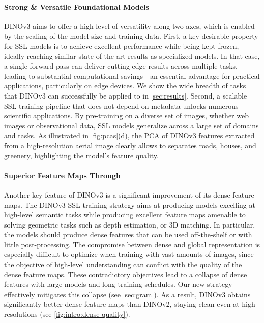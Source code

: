 \paragraph{Strong \& Versatile Foundational Models}  
DINOv3 aims to offer a high level of versatility along two axes, which is enabled by the scaling of the model size and training data. 
First, a key desirable property for SSL models is to achieve excellent performance while being kept frozen, ideally reaching similar state-of-the-art results as specialized models. 
In that case, a single forward pass can deliver cutting-edge results across multiple tasks, leading to substantial computational savings---an essential advantage for practical applications, particularly on edge devices. 
We show the wide breadth of tasks that DINOv3 can successfully be applied to in \cref{sec:results}.
Second, a scalable SSL training pipeline that does not depend on metadata unlocks numerous scientific applications. 
By pre-training on a diverse set of images, whether web images or observational data, SSL models generalize across a large set of domains and tasks. 
As illustrated in \cref{fig:pcas}(d), the PCA of DINOv3 features extracted from a high-resolution aerial image clearly allows to separates roads, houses, and greenery, highlighting the model’s feature quality. 

\paragraph[Superior Feature Maps Through Gram]{Superior Feature Maps Through \Gramname}
Another key feature of DINOv3 is a significant improvement of its dense feature maps. 
The DINOv3 SSL training strategy aims at producing models excelling at high-level semantic tasks while producing excellent feature maps amenable to solving geometric tasks such as depth estimation, or 3D matching.
In particular, the models should produce dense features that can be used off-the-shelf or with little post-processing. 
The compromise between dense and global representation is especially difficult to optimize when training with vast amounts of images, since the objective of high-level understanding can conflict with the quality of the dense feature maps. 
These contradictory objectives lead to a collapse of dense features with large models and long training schedules.
Our new \gramname strategy effectively mitigates this collapse (see \cref{sec:gram}).
As a result, DINOv3 obtains significantly better dense feature maps than DINOv2, staying clean even at high resolutions (see \cref{fig:intro:dense-quality}). 

